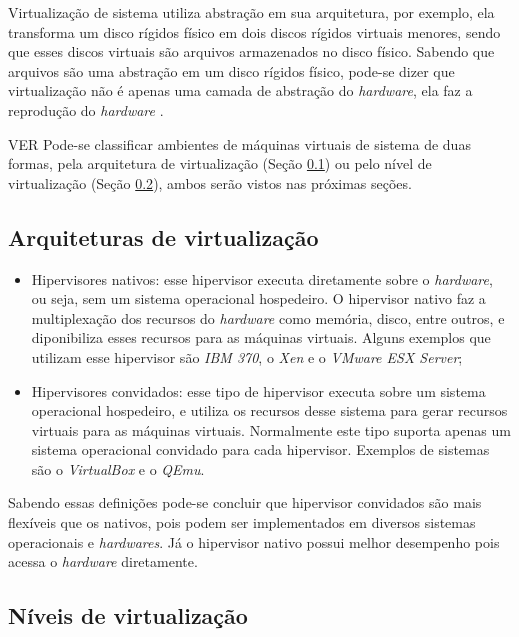 Virtualização de sistema utiliza abstração em sua arquitetura, por exemplo, ela transforma um disco rígidos físico em dois discos rígidos
virtuais menores, sendo que esses discos virtuais são arquivos armazenados no disco físico. Sabendo que arquivos são uma abstração
em um disco rígidos físico, pode-se dizer que virtualização não é apenas uma camada de abstração do \textit{hardware}, ela faz a reprodução 
do \textit{hardware} \cite{smithenair2005}.


VER
Pode-se classificar ambientes de máquinas virtuais de sistema de duas formas, pela arquitetura de virtualização 
(Seção \ref{section:virtarq}) ou pelo nível de virtualização (Seção \ref{section:virtniv}), ambos serão vistos nas próximas seções.

\subsection{Arquiteturas de virtualização}
\label{section:virtarq}

\begin{itemize}
 \item Hipervisores nativos: esse hipervisor executa diretamente sobre o \textit{hardware}, ou seja, sem um sistema operacional
 hospedeiro. O hipervisor nativo faz a multiplexação dos recursos do \textit{hardware} como memória, disco, entre outros,
 e diponibiliza esses recursos para as máquinas virtuais. Alguns exemplos que utilizam esse hipervisor são \textit{IBM 370}, 
 o \textit{Xen} e o \textit{VMware ESX Server};
 \item Hipervisores convidados: esse tipo de hipervisor executa sobre um sistema operacional hospedeiro, e utiliza os recursos 
 desse sistema para gerar recursos virtuais para as máquinas virtuais. Normalmente este tipo suporta apenas um sistema 
 operacional convidado para cada hipervisor. Exemplos de sistemas são o \textit{VirtualBox} e o \textit{QEmu}.
\end{itemize}

Sabendo essas definições pode-se concluir que hipervisor convidados são mais flexíveis que os nativos, pois podem ser implementados
em diversos sistemas operacionais e \textit{hardwares}. Já o hipervisor nativo possui melhor desempenho pois acessa o \textit{hardware}
diretamente.

\subsection{Níveis de virtualização}
\label{section:virtniv}

